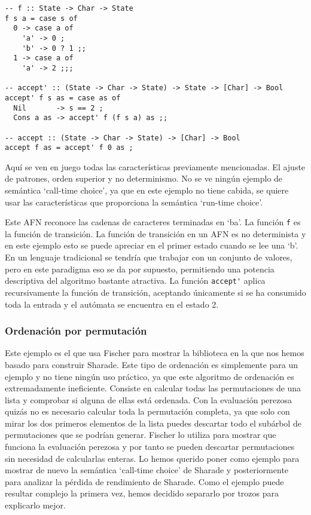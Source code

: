 \documentclass[class=article, crop=false]{standalone}
\begin{document}
\begin{verbatim}
-- f :: State -> Char -> State
f s a = case s of
  0 -> case a of
    'a' -> 0 ;
    'b' -> 0 ? 1 ;;
  1 -> case a of
    'a' -> 2 ;;;

-- accept' :: (State -> Char -> State) -> State -> [Char] -> Bool
accept' f s as = case as of
  Nil       -> s == 2 ;
  Cons a as -> accept' f (f s a) as ;;

-- accept :: (State -> Char -> State) -> [Char] -> Bool
accept f as = accept' f 0 as ;
\end{verbatim}

Aquí se ven en juego todas las características previamente mencionadas. El ajuste de
patrones, orden superior y no determinismo. No se ve ningún ejemplo de semántica `call-time
choice', ya que en este ejemplo no tiene cabida, se quiere usar las características que
proporciona la semántica `run-time choice'.

Este AFN reconoce las cadenas de caracteres terminadas en `ba'. La función \verb`f` es la
función de transición. La función de transición en un AFN es no determinista y en este
ejemplo esto se puede apreciar en el primer estado cuando se lee una `b'. En un lenguaje
tradicional se tendría que trabajar con un conjunto de valores, pero en este paradigma eso se
da por supuesto, permitiendo una potencia descriptiva del algoritmo bastante atractiva. La
función \verb`accept'` aplica recursivamente la función de transición, aceptando únicamente
si se ha consumido toda la entrada y el autómata se encuentra en el estado 2.

\subsubsection{Ordenación por permutación}

Este ejemplo es el que usa Fischer para mostrar la biblioteca en la que nos hemos basado para
construir Sharade. Este tipo de ordenación es simplemente para un ejemplo y no tiene
ningún uso práctico, ya que este algoritmo de ordenación es extremadamente ineficiente.
Consiste en calcular todas las permutaciones de una lista y comprobar si alguna de ellas está
ordenada. Con la evaluación perezosa quizás no es necesario calcular toda la permutación
completa, ya que solo con mirar los dos primeros elementos de la lista puedes descartar todo
el subárbol de permutaciones que se podrían generar. Fischer lo utiliza para mostrar que
funciona la evaluación perezosa y por tanto se pueden descartar permutaciones sin necesidad
de calcularlas enteras. Lo hemos querido poner como ejemplo para mostrar de nuevo la
semántica `call-time choice' de Sharade y posteriormente para analizar la pérdida de
rendimiento de Sharade. Como el ejemplo puede resultar complejo la primera vez, hemos
decidido separarlo por trozos para explicarlo mejor.
\end{document}
